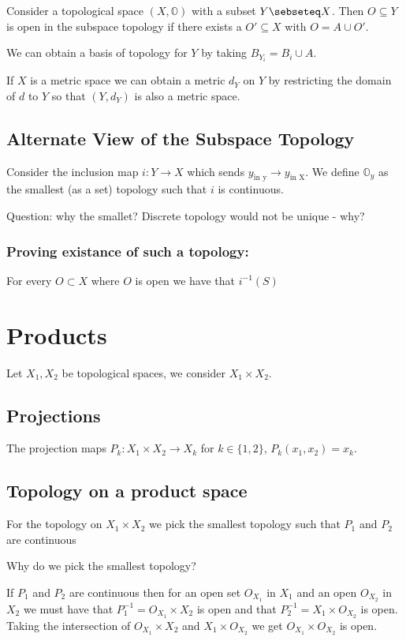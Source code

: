 \documentclass{homework}
\newcommand{\OO}{\mathbb{O}}
\begin{document}
Consider a topological space $(X, \OO)$ with a subset $Y \sebseteq X$. Then $O \subseteq Y$ is open in the subspace topology if there exists a $O' \subseteq X$ with $O = A \cup O'$.

We can obtain a basis of topology for $Y$ by taking $B_{Y_i} = B_i \cup A.$

If $X$ is a metric space we can obtain a metric $d_Y$ on $Y$ by restricting the domain of $d$ to $Y$  so that $(Y,d_Y)$ is also a metric space.




\subsection{Alternate View of the Subspace Topology}

Consider the inclusion map $i: Y \rightarrow X$ which sends $y_{\text{in y}} \rightarrow y_{\text{in X}}$. We define $\OO_y$ as the smallest (as a set) topology such that $i$ is continuous. 

Question: why the smallet? Discrete topology would not be unique - why?

\subsubsection{Proving existance of such a topology:}
For every $O \subset X$ where $O$ is open we have that $i^{-1}(S)$


\section{Products}

Let $X_1,X_2$ be topological spaces, we consider $X_1 \times X_2$. 

\subsection{Projections}
The projection maps $P_k:X_1 \times X_2 \rightarrow X_k$ for $k \in \{1,2\}$, $P_k(x_1,x_2) = x_k$. 

\subsection{Topology on a product space}
For the topology on $X_1 \times X_2$ we pick the smallest topology such that $P_1$ and $P_2$ are continuous

\question Why do we pick the smallest topology?

If $P_1$ and $P_2$ are continuous then for an open set $O_{X_1}$ in $X_1$ and an open $O_{X_2}$ in $X_2$ we must have that $P_1^{-1} = O_{X_1} \times X_2$ is open and that $P_2^{-1} = X_1 \times O_{X_2}$ is open. Taking the intersection of $O_{X_1} \times X_2$ and $X_1 \times O_{X_2}$ we get $O_{X_1} \times O_{X_2}$ is open. 
\end{document}
